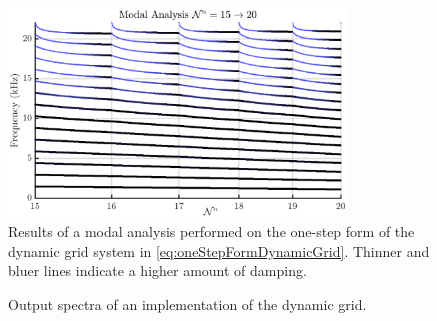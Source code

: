 \begin{figure}[h]
    \centering
    \includegraphics[width=0.8\textwidth]{figures/contributions/dynamicgrid/modalAnalysisOneStep.eps}\caption{Results of a modal analysis performed on the one-step form of the dynamic grid system in \eqref{eq:oneStepFormDynamicGrid}. Thinner and bluer lines indicate a higher amount of damping.\label{fig:modalAnalysisOneStep}}
\end{figure}

\begin{figure}[h]
    \centering
    \hfill
    \caption{Output spectra of an implementation of the dynamic grid.}\label{fig:specResults}
\end{figure}
